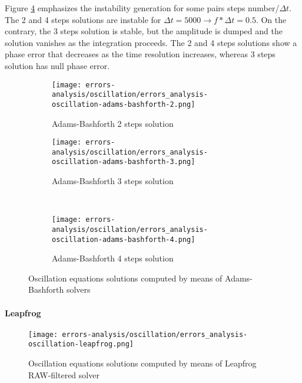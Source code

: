 \documentclass[pdftex,preprint,3p,times,numbers]{elsarticle}
\begin{document}
Figure \ref{fig:results-oscillation-adams-bashforth} emphasizes the instability generation for some pairs steps number/$\Delta t$. The 2 and 4 steps solutions are instable for $\Delta t=5000 \rightarrow f*\Delta t=0.5$. On the contrary, the 3 steps solution is stable, but the amplitude is dumped and the solution vanishes as the integration proceeds. The 2 and 4 steps solutions show a phase error that decreases as the time resolution increases, whereas 3 steps solution has null phase error.

\begin{figure}[!ht]
  \centering
  \begin{subfigure}[b]{0.45\textwidth}
    \centering
    \texttt{[image: errors-analysis/oscillation/errors\_analysis-oscillation-adams-bashforth-2.png]}
    \caption{Adams-Bashforth 2 steps solution}\label{fig:results-oscillation-adams-bashforth-2}
  \end{subfigure}\quad%
  \begin{subfigure}[b]{0.45\textwidth}
    \centering
    \texttt{[image: errors-analysis/oscillation/errors\_analysis-oscillation-adams-bashforth-3.png]}
    \caption{Adams-Bashforth 3 steps solution}\label{fig:results-oscillation-adams-bashforth-3}
  \end{subfigure}\\
  \begin{subfigure}[b]{0.45\textwidth}
    \centering
    \texttt{[image: errors-analysis/oscillation/errors\_analysis-oscillation-adams-bashforth-4.png]}
    \caption{Adams-Bashforth 4 steps solution}\label{fig:results-oscillation-adams-bashforth-4}
  \end{subfigure}
  \caption{Oscillation equations solutions computed by means of Adams-Bashforth solvers}\label{fig:results-oscillation-adams-bashforth}
\end{figure}

\paragraph{Leapfrog}

\begin{figure}[!ht]
  \centering
  \texttt{[image: errors-analysis/oscillation/errors\_analysis-oscillation-leapfrog.png]}
  \caption{Oscillation equations solutions computed by means of Leapfrog RAW-filtered solver}\label{fig:results-oscillation-leapfrog}
\end{figure}
\end{document}
